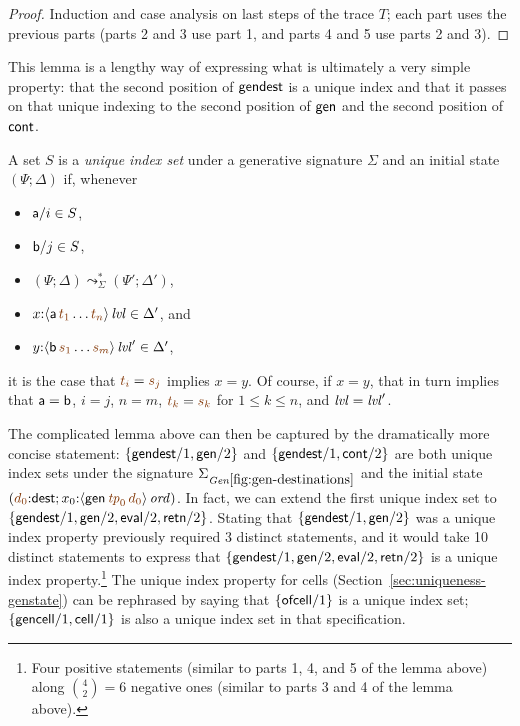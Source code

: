 \begin{proof}
  Induction and case analysis on last steps of the trace $T$; each
  part uses the previous parts (parts 2 and 3 use part 1, and parts 4
  and 5 use parts 2 and 3).
\end{proof}

This lemma is a lengthy way of expressing what is ultimately a
very simple property: that the second position of ${\sf gendest}$ is a
unique index and that it passes on that unique indexing to the second
position of ${\sf gen}$ and the second position of ${\sf cont}$. 

\bigskip
\begin{definition}
A set $S$ is a {\em unique index set} under a generative signature
$\Sigma$ and an initial state $(\Psi; \Delta)$ if, whenever
\begin{itemize}
\item ${\sf a}/i \in S$, 
\item ${\sf b}/j \in S$, 
\item $(\Psi; \Delta) \leadsto^*_{\Sigma} (\Psi'; \Delta')$, 
\item $x{:}\islvl{\susp{{\sf a}\,\lf{t_1}\ldots \lf{t_n}}} \in \Delta'$, and
\item $y{:}\islvl{\susp{{\sf b}\,\lf{s_1}\ldots \lf{s_m}}}' \in \Delta'$,
\end{itemize}
it is the case that $\lf{t_i} = \lf{s_j}$ implies $x = y$. Of course, if
$x = y$, that in turn implies that ${\sf a} = {\sf b}$, 
$i = j$, $n = m$, $\lf{t_k} = \lf{s_k}$ for $1 \leq k \leq n$, and 
${\it lvl} = {\it lvl}'$. 
\end{definition}
\bigskip

The complicated lemma above can then be captured by the dramatically
more concise statement: $\{ {\sf gendest}/1, {\sf gen}/2 \}$ and $\{
{\sf gendest}/1, {\sf cont}/2 \}$ are both unique index sets under the
signature $\siggendests$ and the initial state $(\lf{d_0}{:}{\sf
  dest}; x_0{:}\istrue{\susp{{\sf gen}\,\lf{{\it
        tp}_0}\,\lf{d_0}}})$. In fact, we can extend the first unique
index set to $\{ {\sf gendest}/1, {\sf gen}/2, {\sf eval}/2, {\sf
  retn}/2 \}$. Stating that $\{ {\sf gendest}/1, {\sf gen}/2 \}$ was a
unique index property previously required 3 distinct statements, and
it would take 10 distinct statements to express that $\{ {\sf
  gendest}/1, {\sf gen}/2, {\sf eval}/2, {\sf retn}/2 \}$ is a unique
index property.\footnote{Four positive statements (similar to parts 1, 4, and 5 of the lemma above) along ${{4}\choose{2}} =
  6$ negative ones (similar to parts 3 and 4 of the lemma above).}
The unique index property for cells (Section~\ref{sec:uniqueness-genstate}) 
can be rephrased by saying that $\{ {\sf ofcell}/1 \}$ is a unique index
set; $\{ {\sf gencell}/1, {\sf cell}/1 \}$ is also a unique index set 
in that specification.

